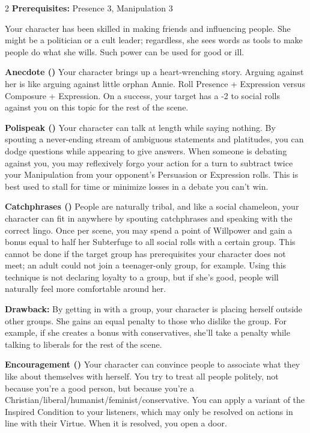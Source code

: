 \begin{multicols}{2}
\textbf{Prerequisites:} Presence 3, Manipulation 3

Your character has been skilled in making friends and influencing people. She might be a politician or a cult leader; regardless, she sees words as tools to make people do what she wills. Such power can be used for good or ill.

\textbf{Anecdote (\textbullet)} Your character brings up a heart-wrenching story. Arguing against her is like arguing against little orphan Annie. Roll Presence + Expression versus Composure + Expression. On a success, your target has a -2 to social rolls against you on this topic for the rest of the scene.

\textbf{Polispeak (\textbullet\textbullet)} Your character can talk at length while saying nothing. By spouting a never-ending stream of ambiguous statements and platitudes, you can dodge questions while appearing to give answers. When someone is debating against you, you may reflexively forgo your action for a turn to subtract twice your Manipulation from your opponent's Persuasion or Expression rolls. This is best used to stall for time or minimize losses in a debate you can't win.

\textbf{Catchphrases (\textbullet\textbullet\textbullet)} People are naturally tribal, and like a social chameleon, your character can fit in anywhere by spouting catchphrases and speaking with the correct lingo. Once per scene, you may spend a point of Willpower and gain a bonus equal to half her Subterfuge to all social rolls with a certain group. This cannot be done if the target group has prerequisites your character does not meet; an adult could not join a teenager-only group, for example. Using this technique is not declaring loyalty to a group, but if she's good, people will naturally feel more comfortable around her.

\textbf{Drawback:} By getting in with a group, your character is placing herself outside other groups. She gains an equal penalty to those who dislike the group. For example, if she creates a bonus with conservatives, she'll take a penalty while talking to liberals for the rest of the scene. 

\textbf{Encouragement (\textbullet\textbullet\textbullet\textbullet)} Your character can convince people to associate what they like about themselves with herself. You try to treat all people politely, not because you're a good person, but because you're a Christian/liberal/humanist/feminist/conservative. You can apply a variant of the Inspired Condition to your listeners, which may only be resolved on actions in line with their Virtue. When it is resolved, you open a door.


\end{multicols}
